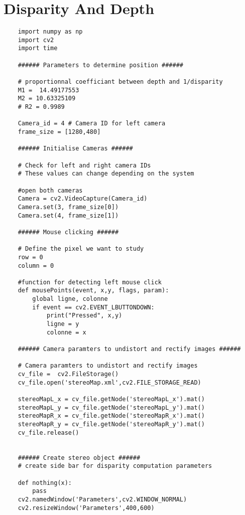 \clearpage\section{Disparity And Depth}
\label{disparityCode}

\begin{verbatim}
    import numpy as np 
    import cv2
    import time
    
    ###### Parameters to determine position ######
    
    # proportionnal coefficiant between depth and 1/disparity
    M1 =  14.49177553
    M2 = 10.63325109
    # R2 = 0.9989
    
    Camera_id = 4 # Camera ID for left camera
    frame_size = [1280,480]
    
    ###### Initialise Cameras ######
    
    # Check for left and right camera IDs
    # These values can change depending on the system
    
    #open both cameras
    Camera = cv2.VideoCapture(Camera_id)
    Camera.set(3, frame_size[0])
    Camera.set(4, frame_size[1])
    
    ###### Mouse clicking ######
    
    # Define the pixel we want to study
    row = 0
    column = 0
    
    #function for detecting left mouse click
    def mousePoints(event, x,y, flags, param):
        global ligne, colonne
        if event == cv2.EVENT_LBUTTONDOWN:
            print("Pressed", x,y)
            ligne = y
            colonne = x
    
    ###### Camera paramters to undistort and rectify images ######
    
    # Camera paramters to undistort and rectify images
    cv_file =  cv2.FileStorage()
    cv_file.open('stereoMap.xml',cv2.FILE_STORAGE_READ)
    
    stereoMapL_x = cv_file.getNode('stereoMapL_x').mat()
    stereoMapL_y = cv_file.getNode('stereoMapL_y').mat()
    stereoMapR_x = cv_file.getNode('stereoMapR_x').mat()
    stereoMapR_y = cv_file.getNode('stereoMapR_y').mat()
    cv_file.release()
    
    
    ###### Create stereo object ######
    # create side bar for disparity computation parameters
    
    def nothing(x):
        pass
    cv2.namedWindow('Parameters',cv2.WINDOW_NORMAL)
    cv2.resizeWindow('Parameters',400,600)
    

\end{verbatim}
